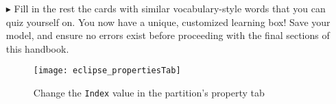 \begin{itemize}
\item[$\blacktriangleright$] Fill in the rest the cards with similar vocabulary-style words that you can quiz yourself on. You now have a unique, customized
learning box! Save your model, and ensure no errors exist before proceeding with the final sections of this handbook.

\newpage

\vspace*{4cm}

\begin{figure}[htbp]
	\centering
  \texttt{[image: eclipse\_propertiesTab]}
	\caption{Change the \texttt{Index} value in the partition's property tab}
	\label{fig:properties_partition}
\end{figure}


\end{itemize}
